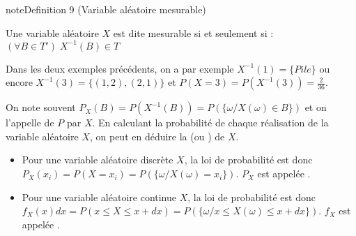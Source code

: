 \documentclass[letterpaper,10pt,english]{jupyterBook}
\begin{document}
\ignorespaces \label{Rappels:definition-21}
\begin{sphinxadmonition}{note}{Definition 9 (Variable aléatoire mesurable)}



\sphinxAtStartPar
Une variable aléatoire \(X\) est dite mesurable  si et seulement si : \((\forall B\in T')\; X^{-1}(B)\in T\)
\end{sphinxadmonition}

\sphinxAtStartPar
Dans les deux exemples précédents, on a par exemple \(X^{-1}(1)= \{Pile\}\) ou encore \(X^{-1}(3) = \{(1,2),(2,1)\}\) et \(P(X=3)=P(X^{-1}(3)) = \frac{2}{36}\).

\ignorespaces 
{}\ignorespaces 
\sphinxAtStartPar
On note souvent \(P_X(B) = P(X^{-1}(B))=P(\{\omega / X(\omega)\in B\})\) et on l’appelle  de \(P\) par \(X\). En calculant la probabilité de chaque réalisation de la variable aléatoire \(X\), on peut en déduire la  (ou ) de \(X\).
\begin{itemize}
\item {} 
\sphinxAtStartPar
Pour une variable aléatoire discrète \(X\), la loi de probabilité est donc \(P_X(x_i)= P(X=x_i) = P(\{\omega / X(\omega)=x_i\})\). \(P_X\) est appelée .

\end{itemize}

\ignorespaces 
{}\ignorespaces \begin{itemize}
\item {} 
\sphinxAtStartPar
Pour une variable aléatoire continue \(X\), la loi de probabilité est donc \(f_X(x)dx = P(x\leq X\leq x+dx) = P(\{\omega /x\leq X(\omega)\leq x+dx\})\). \(f_X\) est appelée .

\end{itemize}
\end{document}
